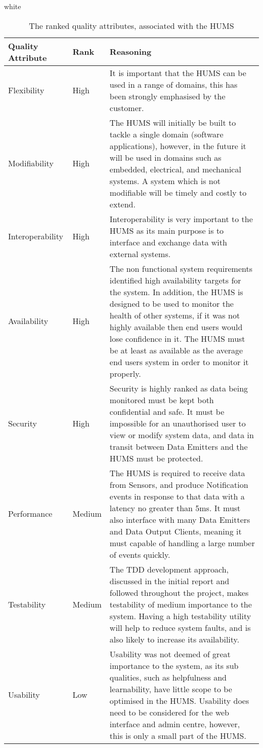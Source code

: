 \documentclass[10pt,a4paper]{article}
\newcommand{\tableformat}[4]{
\begin{table}[h]
\centering
  \rowcolors{2}{gray!10} {white}
\begin{tabular}{#1}
  \hline
  \rowcolor[gray]{0.9} #2
\end{tabular}
\caption{#3}
\label{#4}
\end{table}}
\begin{document}
\tableformat{p{2.4cm} p{1.2cm} p{11.2cm}}{
\hline
Quality \qquad Attribute & Rank & Reasoning \\
\hline
Flexibility & High &  It is important that the HUMS can be used in a range of domains, this has been strongly emphasised by the customer. 
\\
Modifiability & High & The HUMS will initially be built to tackle a single domain (software applications), however, in the future it will be used in domains such as embedded, electrical, and mechanical systems. A system which is not modifiable will be timely and costly to extend. 
\\
Interoperability & High & Interoperability is very important to the HUMS as its main purpose is to interface and exchange data with external systems. 
\\
Availability & High &  The non functional system requirements identified high availability targets for the system. In addition, the HUMS is designed to be used to monitor the health of other systems, if it was not highly available then end users would lose confidence in it. The HUMS must be at least as available as the average end users system in order to monitor it properly. 
 \\
Security & High & Security is highly ranked as data being monitored must be kept both confidential and safe. It must be impossible for an unauthorised user to view or modify system data, and data in transit between Data Emitters and the HUMS must be protected.
\\
Performance & Medium & The HUMS is required to receive data from Sensors, and produce Notification events in response to that data with a latency no greater than 5ms. It must also  interface with many Data Emitters and Data Output Clients, meaning it must capable of handling a large number of events quickly. 
\\
Testability & Medium & The TDD development approach, discussed in the initial report and followed throughout the project, makes testability of medium importance to the system. Having a high testability utility will help to reduce system faults, and is also likely to increase its availability. 
\\
Usability & Low & Usability was not deemed of great importance to the system, as its sub qualities, such as helpfulness and learnability, have little scope to be optimised in the HUMS. Usability does need to be considered for the web interface and admin centre, however, this is only a small part of the HUMS.
\\
}{The ranked quality attributes, associated with the HUMS}{tab:qualities}
\end{document}
